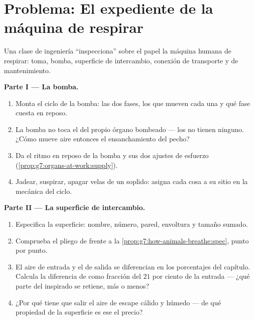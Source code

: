 \section{Problema: El expediente de la máquina de respirar}

\begin{problem}\label{pb:g7:lungs-and-gas-exchange:1}
Una clase de ingeniería ``inspecciona'' sobre el papel la máquina
humana de respirar: toma, bomba, superficie de intercambio, conexión de
transporte y  de mantenimiento.

\medskip\noindent\textbf{Parte I --- La bomba.}
\begin{enumerate}
  \item Monta el ciclo de la bomba: las dos fases, los que mueven cada
        una y qué fase cuesta  en reposo.
  \item La bomba no toca el  del propio órgano bombeado --- los
         no tienen ninguno. ¿Cómo mueve aire entonces el
        ensanchamiento del pecho?
  \item Da el ritmo en reposo de la bomba y sus dos ajustes de esfuerzo
        (\cref{prop:g7:organs-at-work:supply}).
  \item Jadear, suspirar, apagar velas de un soplido: asigna cada cosa
        a su sitio en la mecánica del ciclo.
\end{enumerate}

\medskip\noindent\textbf{Parte II --- La superficie de intercambio.}
\begin{enumerate}[resume]
  \item Especifica la superficie: nombre, número, pared, envoltura y
        tamaño sumado.
  \item Comprueba el pliego de  frente a la
        \cref{prop:g7:how-animals-breathe:spec}, punto por punto.
  \item El aire de entrada y el de salida se diferencian en los
        porcentajes del capítulo. Calcula la diferencia de  como
        fracción del $21$ por ciento de la entrada --- ¿qué parte del
         inspirado se retiene, más o menos?
  \item ¿Por qué tiene que salir el aire de escape cálido y húmedo ---
        de qué propiedad de la superficie es ese el precio?
\end{enumerate}


\end{problem}
